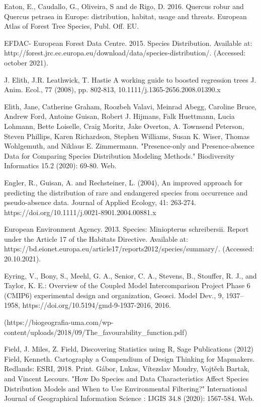 \documentclass[12pt,a4paper]{article}
\begin{document}
\begin{thebibliography}{999}
Eaton, E., Caudallo, G., Oliveira, S and de Rigo, D. 2016. Quercus robur and Quercus petraea in Europe: distribution, habitat, usage and threats. European Atlas of Forest Tree Species, Publ. Off. EU.

EFDAC- European Forest Data Centre. 2015. Species Distribution. Available at: http://forest.jrc.ec.europa.eu/download/data/species-distribution/. (Accessed: october 2021).

J. Elith, J.R. Leathwick, T. Hastie
A working guide to boosted regression trees
J. Anim. Ecol., 77 (2008), pp. 802-813, 10.1111/j.1365-2656.2008.01390.x

Elith, Jane, Catherine Graham, Roozbeh Valavi, Meinrad Abegg, Caroline Bruce, Andrew Ford, Antoine Guisan, Robert J. Hijmans, Falk Huettmann, Lucia Lohmann, Bette Loiselle, Craig Moritz, Jake Overton, A. Townsend Peterson, Steven Phillips, Karen Richardson, Stephen Williams, Susan K. Wiser, Thomas Wohlgemuth, and Niklaus E. Zimmermann. "Presence-only and Presence-absence Data for Comparing Species Distribution Modeling Methods." Biodiversity Informatics 15.2 (2020): 69-80. Web.

Engler, R., Guisan, A. and Rechsteiner, L. (2004), An improved approach for predicting the distribution of rare and endangered species from occurrence and pseudo-absence data. Journal of Applied Ecology, 41: 263-274. https://doi.org/10.1111/j.0021-8901.2004.00881.x

European Environment Agency. 2013. Species: Miniopterus schreibersii. Report under the Article 17 of the Habitats Directive. Available at: https://bd.eionet.europa.eu/article17/reports2012/species/summary/. (Accessed: 20.10.2021).

Eyring, V., Bony, S., Meehl, G. A., Senior, C. A., Stevens, B., Stouffer, R. J., and Taylor, K. E.: Overview of the Coupled Model Intercomparison Project Phase 6 (CMIP6) experimental design and organization, Geosci. Model Dev., 9, 1937–1958, https://doi.org/10.5194/gmd-9-1937-2016, 2016.

(https://biogeografia-uma.com/wp-content/uploads/2018/09/The\_favourability\_function.pdf)


Field, J. Miles, Z. Field, Discovering Statistics using R, Sage Publications (2012)
Field, Kenneth. Cartography a Compendium of Design Thinking for Mapmakers. Redlands: ESRI, 2018. Print.
Gábor, Lukas, Vítezslav Moudry, Vojtěch Bartak, and Vincent Lecours. "How Do Species and Data Characteristics Affect Species Distribution Models and When to Use Environmental Filtering?" International Journal of Geographical Information Science : IJGIS 34.8 (2020): 1567-584. Web.


\end{thebibliography}
\end{document}
